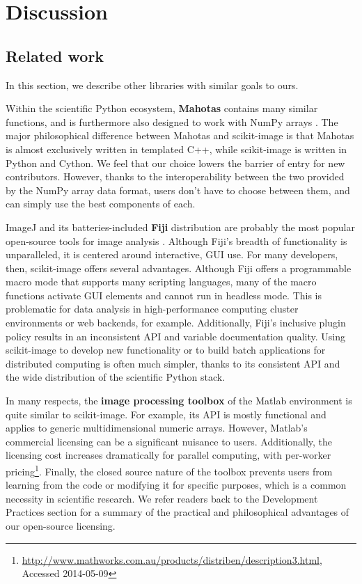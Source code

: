 
\section*{Discussion}
  \label{sec:discussion}

  \subsection*{Related work}

  In this section, we describe other libraries with similar goals to ours.
  
  Within the scientific Python ecosystem, \textbf{Mahotas} contains many similar
  functions, and is furthermore also designed to work with NumPy arrays
  \citep{Mahotas}. The major philosophical difference between Mahotas and
  scikit-image is that Mahotas is almost exclusively written in templated C++,
  while scikit-image is written in Python and Cython. We feel that our choice
  lowers the barrier of entry for new contributors. However,
  thanks to the interoperability between the two provided by the NumPy array
  data format, users don't have to choose between them, and can simply use the
  best components of each.

  ImageJ and its batteries-included \textbf{Fiji} distribution are probably the most
  popular open-source tools for image analysis \citep{imagej,Fiji}. Although 
  Fiji's breadth of functionality is unparalleled, it is centered around 
  interactive, GUI use. For many developers, then, scikit-image offers several
  advantages. Although Fiji offers a
  programmable macro mode that supports many scripting languages, many of the
  macro functions activate GUI elements and cannot run in headless mode. This
  is problematic for data analysis in high-performance computing
  cluster environments or web backends, for example. Additionally, Fiji's
  inclusive plugin policy results in an inconsistent API and variable
  documentation quality. Using scikit-image to develop new functionality or
  to build batch applications for distributed computing is often much simpler,
  thanks to its consistent API and the wide distribution of the scientific
  Python stack.

  In many respects, the \textbf{image processing toolbox} of the Matlab environment is
  quite similar to scikit-image. For example, its API is mostly functional and
  applies to generic multidimensional numeric arrays. However, Matlab's
  commercial licensing can be a significant nuisance to users. Additionally,
  the licensing cost increases dramatically for parallel computing, with
  per-worker pricing\footnote{\url{http://www.mathworks.com.au/products/distriben/description3.html}, Accessed 2014-05-09}.
  Finally, the closed source nature of the toolbox prevents users from
  learning from the code or modifying it for specific purposes, which is a
  common necessity in scientific research. We refer readers back to the
  Development Practices section for a summary of the practical and
  philosophical advantages of our open-source licensing.

